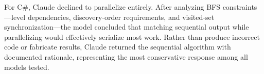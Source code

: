 For C\#, Claude declined to parallelize entirely. After analyzing BFS constraints---level dependencies, discovery-order requirements, and visited-set synchronization---the model concluded that matching sequential output while parallelizing would effectively serialize most work. Rather than produce incorrect code or fabricate results, Claude returned the sequential algorithm with documented rationale, representing the most conservative response among all models tested.
